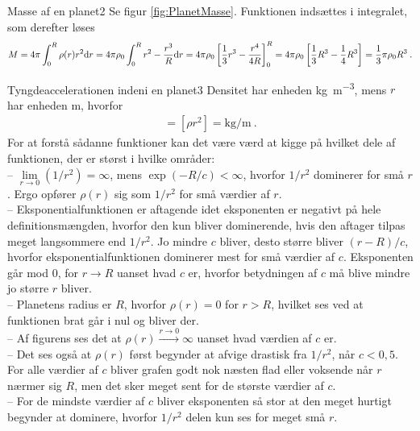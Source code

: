 %
%
\begin{opgave}{Masse af en planet}{2}
\opg Se figur \ref{fig:PlanetMasse}.
\opg Funktionen indsættes i integralet, som derefter løses
\begin{align*}
    M = 4\pi\int_0^R\rho(r)r^2\mathrm{d} r = 4\pi\rho_0\int_0^R r^2 - \frac{r^3}{R} \mathrm{d} r = 4\pi\rho_0 \left[\frac{1}{3}r^3 - \frac{r^4}{4R}\right]_0^R = 4\pi\rho_0 \left[\frac{1}{3}R^3 - \frac{1}{4}R^3\right] = \frac{1}{3}\pi\rho_0R^3 \: .
\end{align*}
\end{opgave}
%
%
\begin{opgave}{Tyngdeaccelerationen indeni en planet}{3}
\opg Densitet har enheden \si{\kilo\gram\per\metre\cubed}, mens $r$ har enheden \si{\metre}, hvorfor
\begin{align*}
    [A] = [\rho r^2] = \si{\kilo\gram\per\metre} \: .
\end{align*}
\opg For at forstå sådanne funktioner kan det være værd at kigge på hvilket dele af funktionen, der er størst i hvilke områder: \\
-- \; $\lim\limits_{r\rightarrow0}(1/r^2) = \infty$, mens $\exp(-R/c) < \infty$, hvorfor $1/r^2$ dominerer for små $r$. Ergo opfører $\rho(r)$ sig som $1/r^2$ for små værdier af $r$. \\
-- \; Eksponentialfunktionen er aftagende idet eksponenten er negativt på hele definitionsmængden, hvorfor den kun bliver dominerende, hvis den aftager tilpas meget langsommere end $1/r^2$. Jo mindre $c$ bliver, desto større bliver $(r-R)/c$, hvorfor eksponentialfunktionen dominerer mest for små værdier af $c$. Eksponenten går mod 0, for $r \rightarrow R$ uanset hvad $c$ er, hvorfor betydningen af $c$ må blive mindre jo større $r$ bliver. \\
-- \; Planetens radius er $R$, hvorfor $\rho(r) = 0$ for $r>R$, hvilket ses ved at funktionen brat går i nul og bliver der. \\
-- \; Af figurens ses det at $\rho(r) \xrightarrow{r\rightarrow0} \infty$ uanset hvad værdien af $c$ er. \\
-- \; Det ses også at $\rho(r)$ først begynder at afvige drastisk fra $1/r^2$, når $c<0,5$. For alle værdier af $c$ bliver grafen godt nok næsten flad eller voksende når $r$ nærmer sig $R$, men det sker meget sent for de største værdier af $c$. \\
-- \; For de mindste værdier af $c$ bliver eksponenten så stor at den meget hurtigt begynder at dominere, hvorfor $1/r^2$ delen kun ses for meget små $r$. \\ \\

\end{opgave}
